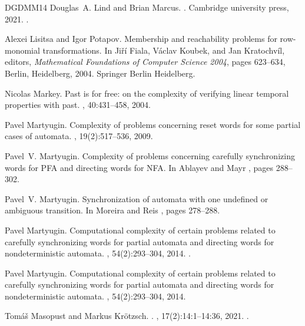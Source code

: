 \documentclass[11pt,a4paper]{amsart}
\theoremstyle{plain}
\theoremstyle{definition}
\theoremstyle{defC}
\theoremstyle{thmC}
\theoremstyle{plain}
\numberwithin{equation}{section}
\begin{document}
\begin{thebibliography}{DGDMM14}
Douglas~A. Lind and Brian Marcus.
.
\newblock Cambridge university press, 2021.
\newblock \href {https://doi.org/10.1017/9781108899727}
  {}.

Alexei Lisitsa and Igor Potapov.
\newblock Membership and reachability problems for row-monomial
  transformations.
\newblock In Ji{\v{r}}{\'i} Fiala, V{\'a}clav Koubek, and Jan Kratochv{\'i}l,
  editors, {\em Mathematical Foundations of Computer Science 2004}, pages
  623--634, Berlin, Heidelberg, 2004. Springer Berlin Heidelberg.

Nicolas Markey.
\newblock Past is for free: on the complexity of verifying linear temporal
  properties with past.
, 40:431--458, 2004.

Pavel Martyugin.
\newblock Complexity of problems concerning reset words for some partial cases
  of automata.
, 19(2):517--536, 2009.

Pavel~V. Martyugin.
\newblock Complexity of problems concerning carefully synchronizing words for
  {PFA} and directing words for {NFA}.
\newblock In Ablayev and Mayr \cite{DBLP:conf/csr/2010}, pages 288--302.

Pavel~V. Martyugin.
\newblock Synchronization of automata with one undefined or ambiguous
  transition.
\newblock In Moreira and Reis \cite{DBLP:conf/wia/2012}, pages 278--288.

Pavel Martyugin.
\newblock Computational complexity of certain problems related to carefully
  synchronizing words for partial automata and directing words for
  nondeterministic automata.
, 54(2):293--304, 2014.
\newblock \href {https://doi.org/10.1007/S00224-013-9516-6}
  {}.

Pavel Martyugin.
\newblock Computational complexity of certain problems related to carefully
  synchronizing words for partial automata and directing words for
  nondeterministic automata.
, 54(2):293--304, 2014.

Tom{\'{a}}\v{s} Masopust and Markus Kr{\"{o}}tzsch.
.
, 17(2):14:1--14:36, 2021.
\newblock \href {https://doi.org/10.23638/LMCS-17(2:14)2021}
  {}.


\end{thebibliography}
\end{document}
